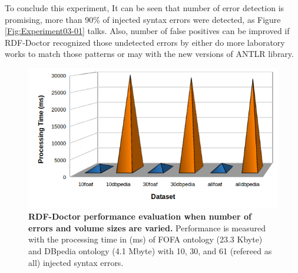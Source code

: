 To conclude this experiment, It can be seen that number of error detection is promising, more than 90\% of injected syntax errors were detected, as Figure \ref{Fig:Experiment03-01} talks. Also, number of false positives can be improved if RDF-Doctor recognized those undetected errors by either do more laboratory works to match those patterns or may with the new versions of ANTLR library.  
\begin{figure}[ht]
\begin{center}
		\includegraphics[scale=0.7,angle=0]{images/Experiment03-03.png}
		\setlength\belowcaptionskip{-5mm}
		\setlength\abovecaptionskip{0mm}
		\caption{\textbf{RDF-Doctor performance evaluation when number of errors and volume sizes are varied.} Performance is measured with the processing time in (ms) of FOFA ontology (23.3 Kbyte) and DBpedia ontology (4.1 Mbyte) with 10, 30, and 61 (refereed as all) injected syntax errors.}
				\label{Fig:Experiment03-03}

\end{center}
\end{figure}

